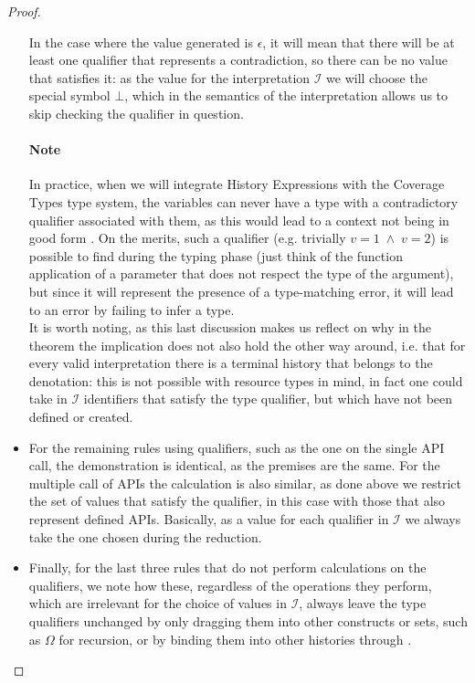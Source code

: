 \begin{proof}
\begin{itemize}
        In the case where the value generated is $\epsilon$, it will mean that there will be at least one qualifier that represents a contradiction, so there can be no value that satisfies it: as the value for the interpretation $\mathcal{I}$ we will choose the special symbol $\bot$, which in the semantics of the interpretation allows us to skip checking the qualifier in question.
        
        \paragraph{Note} In practice, when we will integrate History Expressions with the Coverage Types type system, the variables can never have a type with a contradictory qualifier associated with them, as this would lead to a context not being in good form \cite{coverage}. On the merits, such a qualifier (e.g. trivially $v = 1 \;\land\; v = 2$) is possible to find during the typing phase (just think of the function application of a parameter that does not respect the type of the argument), but since it will represent the presence of a type-matching error, it will lead to an error by failing to infer a type. \\

        It is worth noting, as this last discussion makes us reflect on why in the theorem the implication does not also hold the other way around, i.e. that for every valid interpretation there is a terminal history that belongs to the denotation: this is not possible with resource types in mind, in fact one could take in $\mathcal{I}$ identifiers that satisfy the type qualifier, but which have not been defined or created.
        \item For the remaining rules using qualifiers, such as the one on the single API call, the demonstration is identical, as the premises are the same. For the multiple call of APIs the calculation is also similar, as done above we restrict the set of values that satisfy the qualifier, in this case with those that also represent defined APIs. Basically, as a value for each qualifier in $\mathcal{I}$ we always take the one chosen during the reduction.
        \item Finally, for the last three rules that do not perform calculations on the qualifiers, we note how these, regardless of the operations they perform, which are irrelevant for the choice of values in $\mathcal{I}$, always leave the type qualifiers unchanged by only dragging them into other constructs or sets, such as $\Omega$ for recursion, or by binding them into other histories through \bind.
    \end{itemize}
\end{proof}

